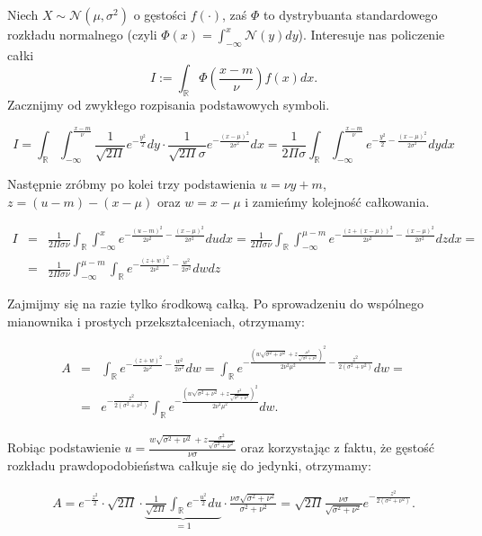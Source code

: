 \documentclass{mini}
\begin{document}
Niech $X \sim \mathcal{N}(\mu, \sigma^2)$ o gęstości $f(\cdot)$, zaś $\Phi$ to dystrybuanta standardowego rozkładu normalnego (czyli $\Phi(x)=\int_{-\infty}^x \mathcal{N}(y) dy$). Interesuje nas policzenie całki
$$
I := \int_\mathbb{R} \Phi(\frac{x-m}{\nu})f(x) dx.
$$
Zacznijmy od zwykłego rozpisania podstawowych symboli.

$$
I = \int_\mathbb{R}\int_{-\infty}^{\frac{x-m}{\nu}} \frac{1}{\sqrt{2\Pi}}e^{-\frac{y^2}{2}} dy \cdot \frac{1}{\sqrt{2\Pi}\sigma}e^{-\frac{(x-\mu)^2}{2\sigma^2}} dx
= 
\frac{1}{2\Pi\sigma}\int_\mathbb{R}\int_{-\infty}^{\frac{x-m}{\nu}} e^{-\frac{y^2}{2} - \frac{(x-\mu)^2}{2\sigma^2}} dy dx
$$

Następnie zróbmy po kolei trzy podstawienia $u = \nu y+m$, $z=(u-m)-(x-\mu)$ oraz $w=x-\mu$ i zamieńmy kolejność całkowania. 

\begin{eqnarray*}
I &=&
\frac{1}{2\Pi\sigma\nu}\int_\mathbb{R}\int_{-\infty}^{x} e^{-\frac{(u-m)^2}{2\nu^2} - \frac{(x-\mu)^2}{2\sigma^2}} du dx
=
\frac{1}{2\Pi\sigma\nu}\int_\mathbb{R}\int_{-\infty}^{\mu-m} e^{-\frac{(z+(x-\mu))^2}{2\nu^2} - \frac{(x-\mu)^2}{2\sigma^2}} dz dx=\\
&=&
\frac{1}{2\Pi\sigma\nu}\int_{-\infty}^{\mu-m}\int_\mathbb{R} e^{-\frac{(z+w)^2}{2\nu^2} - \frac{w^2}{2\sigma^2}} dw dz
\end{eqnarray*}

Zajmijmy się na razie tylko środkową całką. Po sprowadzeniu do wspólnego mianownika i prostych przekształceniach, otrzymamy:

\begin{eqnarray*}
A &=& \int_\mathbb{R} e^{-\frac{(z+w)^2}{2\nu^2} - \frac{w^2}{2\sigma^2}} dw
=
\int_\mathbb{R} e^{-\frac{\left(w\sqrt{\sigma^2+\nu^2} + z\frac{\sigma^2}{\sqrt{\sigma^2+\nu^2}}\right)^2}{2\nu^2\mu^2} - \frac{z^2}{2(\sigma^2+\nu^2)}} dw=\\
&=&
e^{- \frac{z^2}{2(\sigma^2+\nu^2)}}\int_\mathbb{R} e^{-\frac{\left(w\sqrt{\sigma^2+\nu^2} + z\frac{\sigma^2}{\sqrt{\sigma^2+\nu^2}}\right)^2}{2\nu^2\mu^2}} dw.
\end{eqnarray*}

Robiąc podstawienie $u = \frac{w\sqrt{\sigma^2+\nu^2} + z\frac{\sigma^2}{\sqrt{\sigma^2+\nu^2}}}{\nu\sigma}$ oraz korzystając z faktu, że gęstość rozkładu prawdopodobieństwa całkuje się do jedynki, otrzymamy:

\begin{eqnarray*}
A = e^{-\frac{z^2}{2}}\cdot \sqrt{2\Pi}\cdot \underbrace{\frac{1}{\sqrt{2\Pi}} \int_{\mathbb{R}} e^{-\frac{u^2}{2}} du}_{=1} \cdot\frac{\nu\sigma\sqrt{\sigma^2+\nu^2}}{\sigma^2+\nu^2}
=
\sqrt{2\Pi}\frac{\nu\sigma}{\sqrt{\sigma^2+\nu^2}}e^{-\frac{z^2}{2(\sigma^2+\nu^2)}}.
\end{eqnarray*}
\end{document}

